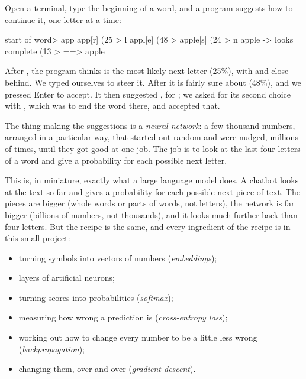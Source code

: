 \documentclass[11pt,a4paper,oneside,openany]{book}
\newcommand{\code}[1]{\texttt{\detokenize{#1}}}
\begin{document}
Open a terminal, type the beginning of a word, and a program suggests how
to continue it, one letter at a time:

\begin{textout}
start of word> app
  app[r]   (25%
  > l
  appl[e]   (48%
  >
  apple[s]   (24%
  > n
  apple   -> looks complete (13%
  >
  ==> apple
\end{textout}

After \code{app}, the program thinks \code{r} is the most likely next letter
(25\%), with \code{l} and \code{o} close behind. We typed \code{l}
ourselves to steer it. After \code{appl} it is fairly sure about \code{e}
(48\%), and we pressed Enter to accept. It then suggested \code{s}, for
\code{apples}; we asked for its second choice with \code{n}, which was
to end the word there, and accepted that.

The thing making the suggestions is a \emph{neural network}: a few thousand
numbers, arranged in a particular way, that started out random and were
nudged, millions of times, until they got good at one job. The job is to
look at the last four letters of a word and give a probability for each
possible next letter.

This is, in miniature, exactly what a large language model does. A chatbot
looks at the text so far and gives a probability for each possible next
piece of text. The pieces are bigger (whole words or parts of words, not
letters), the network is far bigger (billions of numbers, not
thousands), and it looks much further back than four letters. But the
recipe is the same, and every ingredient of the recipe is in this small
project:
\begin{itemize}[nosep]
  \item turning symbols into vectors of numbers (\emph{embeddings});
  \item layers of artificial neurons;
  \item turning scores into probabilities (\emph{softmax});
  \item measuring how wrong a prediction is (\emph{cross-entropy loss});
  \item working out how to change every number to be a little less wrong
        (\emph{backpropagation});
  \item changing them, over and over (\emph{gradient descent}).
\end{itemize}
\end{document}

